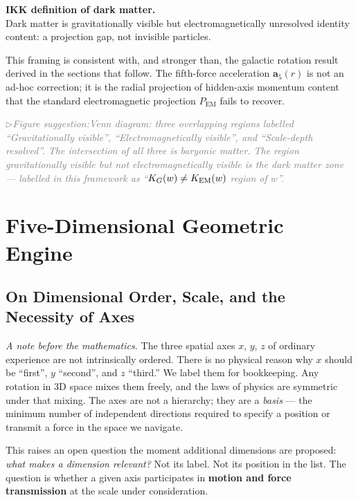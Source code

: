 \documentclass[11pt,a4paper]{article}
\newcommand{\afive}{\mathbf{a}_5}            %
\newcommand{\figsuggest}[1]{%
  \medskip
  \noindent\hspace{0pt}\textcolor{gray}{\small\itshape
    $\triangleright$\;Figure suggestion:\enspace #1}%
  \medskip}
\begin{document}
\begin{keybox}
\textbf{IKK definition of dark matter.}\\
Dark matter is gravitationally visible but electromagnetically unresolved
identity content: a projection gap, not invisible particles.
\end{keybox}

\noindent
This framing is consistent with, and stronger than, the galactic rotation
result derived in the sections that follow.  The fifth-force acceleration
$\afive(r)$ is not an ad-hoc correction; it is the radial projection of
hidden-axis momentum content that the standard electromagnetic projection
$P_{\text{EM}}$ fails to recover.

\figsuggest{Venn diagram: three overlapping regions labelled
``Gravitationally visible'', ``Electromagnetically visible'', and
``Scale-depth resolved''.  The intersection of all three is baryonic
matter.  The region gravitationally visible but not electromagnetically
visible is the dark matter zone --- labelled in this framework as
``$K_G(w) \neq K_{\rm EM}(w)$ region of $w$''.}

\section{Five-Dimensional Geometric Engine}\label{sec:geometry}

\subsection{On Dimensional Order, Scale, and the Necessity of Axes}
\label{sec:dimorder}

\textit{A note before the mathematics.}\enspace
The three spatial axes $x$, $y$, $z$ of ordinary experience are not
intrinsically ordered.  There is no physical reason why $x$ should be
``first'', $y$ ``second'', and $z$ ``third.''  We label them for
bookkeeping.  Any rotation in 3D space mixes them freely, and the laws
of physics are symmetric under that mixing.  The axes are not a
hierarchy; they are a \emph{basis} --- the minimum number of independent
directions required to specify a position or transmit a force in the
space we navigate.

\medskip
\noindent
This raises an open question the moment additional dimensions are proposed:
\emph{what makes a dimension relevant?}  Not its label.  Not its position
in the list.  The question is whether a given axis participates in
\textbf{motion and force transmission} at the scale under consideration.
\end{document}
